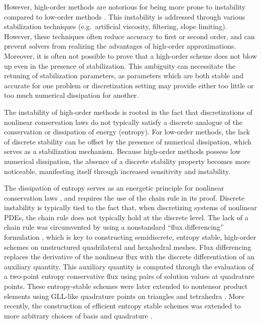 \documentclass[review,onefignum,onetabnum,final]{siamart171218}
\begin{document}
However, high-order methods are notorious for being more prone to instability compared to low-order methods \cite{wang2013high}.  This instability is addressed through various stabilization techniques (e.g.\ artificial viscosity, filtering, slope limiting).  However, these techniques often reduce accuracy to first or second order, and can prevent solvers from realizing the advantages of high-order approximations.  Moreover, it is often not possible to prove that a high-order scheme does not blow up even in the presence of stabilization.  This ambiguity can necessitate the retuning of stabilization parameters, as parameters which are both stable and accurate for one problem or discretization setting  may provide either too little or too much numerical dissipation for another.  

The instability of high-order methods is rooted in the fact that discretizations of nonlinear conservation laws do not typically satisfy a discrete analogue of the conservation or dissipation of energy (entropy).  For low-order methods, the lack of discrete stability can be offset by the presence of numerical dissipation, which serves as a stabilization mechanism.  Because high-order methods possess low numerical dissipation, the absence of a discrete stability property becomes more noticeable, manifesting itself through increased sensitivity and instability.  

The dissipation of entropy serves as an energetic principle for nonlinear conservation laws \cite{dafermos2005compensated}, and requires the use of the chain rule in its proof.  Discrete instability is typically tied to the fact that, when discretizing systems of nonlinear PDEs, the chain rule does not typically hold at the discrete level.  The lack of a chain rule was circumvented by using a nonstandard ``flux differencing'' formulation \cite{fisher2013high, carpenter2014entropy, gassner2016split, gassner2017br1}, which is key to constructing semidiscrete, entropy stable, high-order schemes on unstructured quadrilateral and hexahedral meshes.  Flux differencing replaces the derivative of the nonlinear flux with the discrete differentiation of an auxiliary quantity.  This auxiliary quantity is computed through the evaluation of a two-point entropy conservative flux \cite{tadmor1987numerical} using pairs of solution values at quadrature points.  These entropy-stable schemes were later extended to nontensor product elements using GLL-like quadrature points on triangles and tetrahedra \cite{chen2017entropy, crean2018entropy}.  More recently, the construction of efficient entropy stable schemes was extended to more arbitrary choices of basis and quadrature \cite{chan2017discretely, chan2018discretely}.  
\end{document}
